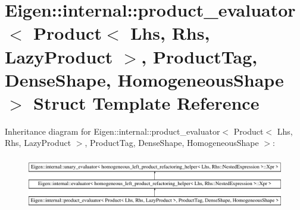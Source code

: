 \hypertarget{struct_eigen_1_1internal_1_1product__evaluator_3_01_product_3_01_lhs_00_01_rhs_00_01_lazy_producdc5bcb3d77429f754f91ead5635235a9}{}\section{Eigen\+::internal\+::product\+\_\+evaluator$<$ Product$<$ Lhs, Rhs, Lazy\+Product $>$, Product\+Tag, Dense\+Shape, Homogeneous\+Shape $>$ Struct Template Reference}
\label{struct_eigen_1_1internal_1_1product__evaluator_3_01_product_3_01_lhs_00_01_rhs_00_01_lazy_producdc5bcb3d77429f754f91ead5635235a9}
Inheritance diagram for Eigen\+::internal\+::product\+\_\+evaluator$<$ Product$<$ Lhs, Rhs, Lazy\+Product $>$, Product\+Tag, Dense\+Shape, Homogeneous\+Shape $>$\+:\begin{figure}[H]
\begin{center}
\leavevmode
\includegraphics[height=2.362869cm]{struct_eigen_1_1internal_1_1product__evaluator_3_01_product_3_01_lhs_00_01_rhs_00_01_lazy_producdc5bcb3d77429f754f91ead5635235a9}
\end{center}
\end{figure}
